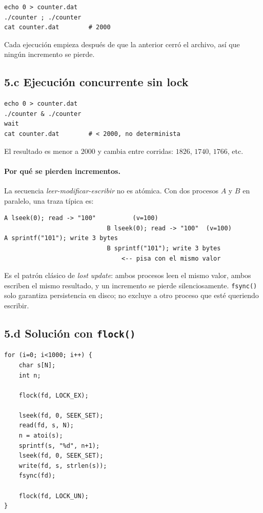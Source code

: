 \documentclass[11pt,a4paper]{article}
\begin{document}
\begin{lstlisting}
echo 0 > counter.dat
./counter ; ./counter
cat counter.dat        # 2000
\end{lstlisting}

Cada ejecución empieza después de que la anterior cerró el archivo, así
que ningún incremento se pierde.

\subsection*{5.c Ejecución concurrente sin lock}

\begin{lstlisting}
echo 0 > counter.dat
./counter & ./counter
wait
cat counter.dat        # < 2000, no determinista
\end{lstlisting}

El resultado es menor a $2000$ y cambia entre corridas: $1826$, $1740$,
$1766$, etc.

\paragraph{Por qué se pierden incrementos.} La secuencia
\emph{leer-modificar-escribir} no es atómica. Con dos procesos $A$ y $B$
en paralelo, una traza típica es:

\begin{lstlisting}[style=textstyle]
A lseek(0); read -> "100"          (v=100)
                            B lseek(0); read -> "100"  (v=100)
A sprintf("101"); write 3 bytes
                            B sprintf("101"); write 3 bytes
                                <-- pisa con el mismo valor
\end{lstlisting}

Es el patrón clásico de \emph{lost update}: ambos procesos leen el mismo
valor, ambos escriben el mismo resultado, y un incremento se pierde
silenciosamente. \texttt{fsync()} solo garantiza persistencia en disco;
no excluye a otro proceso que esté queriendo escribir.

\subsection*{5.d Solución con \texttt{flock()}}

\begin{lstlisting}[style=cstyle]
for (i=0; i<1000; i++) {
    char s[N];
    int n;

    flock(fd, LOCK_EX);

    lseek(fd, 0, SEEK_SET);
    read(fd, s, N);
    n = atoi(s);
    sprintf(s, "%d", n+1);
    lseek(fd, 0, SEEK_SET);
    write(fd, s, strlen(s));
    fsync(fd);

    flock(fd, LOCK_UN);
}
\end{lstlisting}
\end{document}
